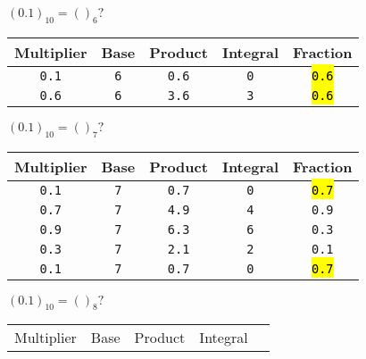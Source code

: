 \documentclass[12pt]{article}
\begin{document}
\begin{minipage}[t]{0.5\textwidth}
	$(0.1)_{10} = ()_6?$
	\begin{center}
		\begin{tabular}{|c|c|c|c|c|}
			\hline \cellcolor{gray!25}Multiplier &
			\cellcolor{gray!25}Base              &
			\cellcolor{gray!25}Product           &
			\cellcolor{gray!25}Integral          &
			\cellcolor{gray!25}Fraction                                                                       \\
			\hline\hline
			\texttt{0.1}                         & \texttt{6} & \texttt{0.6} & \texttt{0} & \hl{\texttt{0.6}} \\\hline
			\texttt{0.6}                         & \texttt{6} & \texttt{3.6} & \texttt{3} & \hl{\texttt{0.6}} \\\hline
		\end{tabular}
	\end{center}
	$(0.1)_{10} = ()_7?$
	\begin{center}
		\begin{tabular}{|c|c|c|c|c|}
			\hline \cellcolor{gray!25}Multiplier &
			\cellcolor{gray!25}Base              &
			\cellcolor{gray!25}Product           &
			\cellcolor{gray!25}Integral          &
			\cellcolor{gray!25}Fraction                                                                       \\
			\hline\hline
			\texttt{0.1}                         & \texttt{7} & \texttt{0.7} & \texttt{0} & \hl{\texttt{0.7}} \\\hline
			\texttt{0.7}                         & \texttt{7} & \texttt{4.9} & \texttt{4} & \texttt{0.9}      \\\hline
			\texttt{0.9}                         & \texttt{7} & \texttt{6.3} & \texttt{6} & \texttt{0.3}      \\\hline
			\texttt{0.3}                         & \texttt{7} & \texttt{2.1} & \texttt{2} & \texttt{0.1}      \\\hline
			\texttt{0.1}                         & \texttt{7} & \texttt{0.7} & \texttt{0} & \hl{\texttt{0.7}} \\\hline
		\end{tabular}
	\end{center}
	$(0.1)_{10} = ()_8?$
	\begin{center}
		\begin{tabular}{|c|c|c|c|c|}
			\hline \cellcolor{gray!25}Multiplier &
			\cellcolor{gray!25}Base              &
			\cellcolor{gray!25}Product           &
			\cellcolor{gray!25}Integral          &

\end{tabular}
\end{center}
\end{minipage}
\end{document}
